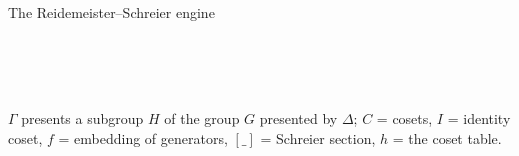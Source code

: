 \begin{frame}{The Reidemeister--Schreier engine \InPaper}
\begin{code}[hide]
%
\>[2]\AgdaOperator{\AgdaPostulate{[\AgdaUnderscore{}]}}%
\>[9]\AgdaSymbol{:}\AgdaSpace{}%
\AgdaSpace{}%
\AgdaSpace{}%
\AgdaSpace{}%
\<%
\\
%
\>[2]\AgdaOperator{\AgdaPostulate{\AgdaUnderscore{}\textasciitilde{}\AgdaUnderscore{}}}%
\>[9]\AgdaSymbol{:}\AgdaSpace{}%
\AgdaSpace{}%
\AgdaSpace{}%
\AgdaSpace{}%
\AgdaSpace{}%
\AgdaSpace{}%
\AgdaSpace{}%
\AgdaSpace{}%
\AgdaSpace{}%
\AgdaSpace{}%
\AgdaSpace{}%
\<%
\\
%
\>[2]\AgdaSpace{}%
\AgdaSymbol{:}\AgdaSpace{}%
\AgdaSpace{}%
\<%
\\
%
\>[2]\AgdaSpace{}%
\AgdaSymbol{:}\AgdaSpace{}%
\AgdaSpace{}%
\<%
\end{code}
\vspace{-2pt}
{\small $\Gamma$ presents a subgroup $H$ of the group $G$ presented by $\Delta$;
$C$ = cosets, $I$ = identity coset, $f$ = embedding of generators,
$[\_]$ = Schreier section, $h$ = the coset table.}
\begin{code}%
\>[0]\AgdaSpace{}%
\<%
\\
\>[0][@{}l@{\AgdaIndent{0}}]%
\>[2]\AgdaSymbol{(}\AgdaSpace{}%
\AgdaSymbol{:}\AgdaSpace{}%
\AgdaSpace{}%
\AgdaSymbol{(}\AgdaSpace{}%
\AgdaSymbol{:}\AgdaSpace{}%
\AgdaSymbol{)}\AgdaSpace{}%
\AgdaSpace{}%
\AgdaSymbol{(}\AgdaOperator{\AgdaInductiveConstructor{[}}\AgdaSpace{}%
\AgdaSpace{}%
\AgdaOperator{\AgdaInductiveConstructor{]ʷ}}\AgdaSpace{}%
\AgdaOperator{\AgdaInductiveConstructor{,}}\AgdaSpace{}%
\AgdaSymbol{)}\AgdaSpace{}%
\AgdaOperator{\AgdaPostulate{\textasciitilde{}}}\AgdaSpace{}%
\AgdaSymbol{((}\AgdaSpace{}%
\AgdaSymbol{)}\AgdaSpace{}%
\AgdaSpace{}%
\AgdaSymbol{(}\AgdaSpace{}%
\AgdaSymbol{)))}%
\>[83]\<%
\\
%
\>[2]\AgdaSymbol{(}\AgdaSpace{}%
\AgdaSymbol{:}\AgdaSpace{}%
\AgdaSpace{}%

\end{code}
\end{frame}
